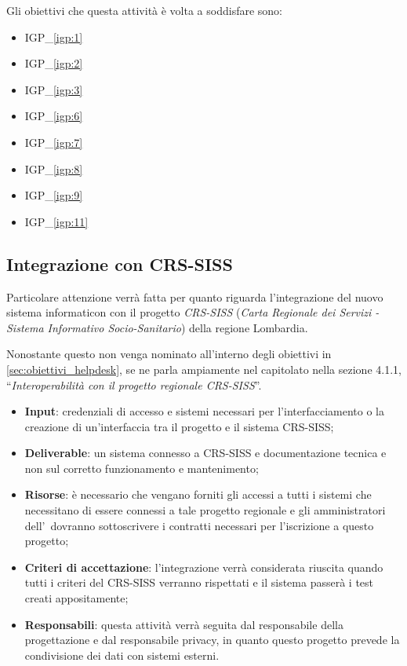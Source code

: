 		Gli obiettivi che questa attività è volta a soddisfare sono:
		\begin{itemize}[noitemsep]
			\renewcommand\labelitemi{--}
			\item {\color{pantone}IGP\_\ref{igp:1}}
			\item {\color{pantone}IGP\_\ref{igp:2}}
			\item {\color{pantone}IGP\_\ref{igp:3}}
			\item {\color{pantone}IGP\_\ref{igp:6}}
			\item {\color{pantone}IGP\_\ref{igp:7}}
			\item {\color{pantone}IGP\_\ref{igp:8}}
			\item {\color{pantone}IGP\_\ref{igp:9}}
			\item {\color{pantone}IGP\_\ref{igp:11}}
		\end{itemize}	

	\subsection{Integrazione con CRS-SISS}
	
		Particolare attenzione verrà fatta per quanto riguarda l'integrazione del nuovo sistema informaticon con il progetto \textit{CRS-SISS} (\textit{Carta Regionale dei Servizi - Sistema Informativo Socio-Sanitario}) della regione Lombardia.
	
		Nonostante questo non venga nominato all'interno degli obiettivi in \ref{sec:obiettivi_helpdesk}, se ne parla ampiamente nel capitolato nella sezione 4.1.1, ``\textit{Interoperabilità con il progetto regionale CRS-SISS}''.
	
		\begin{itemize}[noitemsep]
			\renewcommand\labelitemi{--}
			\item \textbf{Input}: credenziali di accesso e sistemi necessari per l'interfacciamento o la creazione di un'interfaccia tra il progetto e il sistema CRS-SISS;
			\item \textbf{Deliverable}: un sistema connesso a CRS-SISS e documentazione tecnica e non sul corretto funzionamento e mantenimento;
			\item \textbf{Risorse}: è necessario che vengano forniti gli accessi a tutti i sistemi che necessitano di essere connessi a tale progetto regionale e gli amministratori dell'\istituto~dovranno sottoscrivere i contratti necessari per l'iscrizione a questo progetto;
			\item \textbf{Criteri di accettazione}: l'integrazione verrà considerata riuscita quando tutti i criteri del CRS-SISS verranno rispettati e il sistema passerà i test creati appositamente;
			\item \textbf{Responsabili}: questa attività verrà seguita dal responsabile della progettazione e dal responsabile privacy, in quanto questo progetto prevede la condivisione dei dati con sistemi esterni.
		\end{itemize}
	
